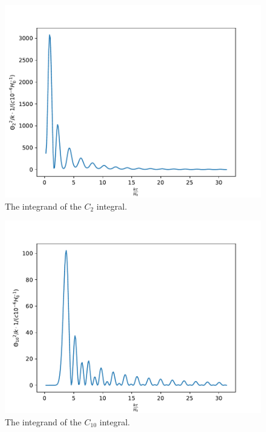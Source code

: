 \documentclass{aa}
\begin{document}
\begin{figure}[h!]
   \includegraphics[scale=0.6]{../figures/milestone4/theta_2_squared.pdf}
   \caption{The integrand of the $C_{2}$ integral.}\label{fig:m4_theta2_squared}
\end{figure}

\begin{figure}[h!]
   \includegraphics[scale=0.6]{../figures/milestone4/theta_10_squared.pdf}
   \caption{The integrand of the $C_{10}$ integral.}\label{fig:m4_theta10_squared}
\end{figure}
\end{document}
